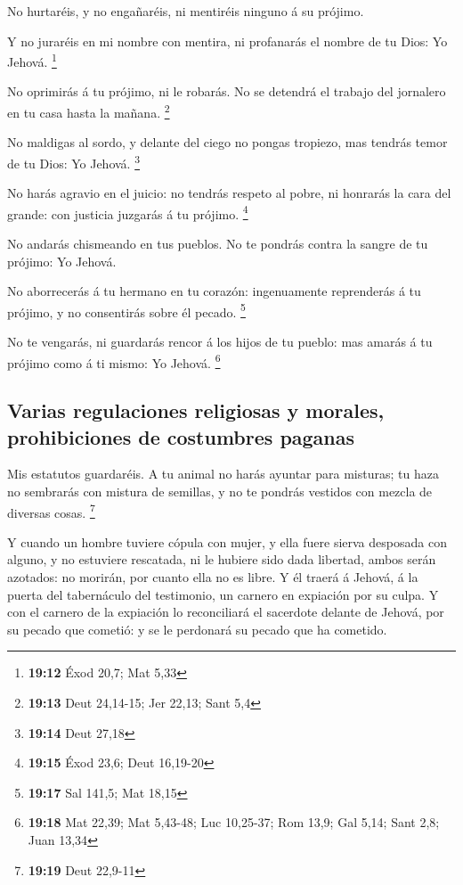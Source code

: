  No hurtaréis, y no engañaréis, ni mentiréis ninguno á su
prójimo.

 Y no juraréis en mi nombre con mentira, ni profanarás el
nombre de tu Dios: Yo Jehová. \footnote{\textbf{19:12} Éxod 20,7; Mat
  5,33}

 No oprimirás á tu prójimo, ni le robarás. No se detendrá
el trabajo del jornalero en tu casa hasta la mañana. \footnote{\textbf{19:13}
  Deut 24,14-15; Jer 22,13; Sant 5,4}

 No maldigas al sordo, y delante del ciego no pongas
tropiezo, mas tendrás temor de tu Dios: Yo Jehová. \footnote{\textbf{19:14}
  Deut 27,18}

 No harás agravio en el juicio: no tendrás respeto al
pobre, ni honrarás la cara del grande: con justicia juzgarás á tu
prójimo. \footnote{\textbf{19:15} Éxod 23,6; Deut 16,19-20}

 No andarás chismeando en tus pueblos. No te pondrás contra
la sangre de tu prójimo: Yo Jehová.

 No aborrecerás á tu hermano en tu corazón: ingenuamente
reprenderás á tu prójimo, y no consentirás sobre él pecado. \footnote{\textbf{19:17}
  Sal 141,5; Mat 18,15}

 No te vengarás, ni guardarás rencor á los hijos de tu
pueblo: mas amarás á tu prójimo como á ti mismo: Yo Jehová. \footnote{\textbf{19:18}
  Mat 22,39; Mat 5,43-48; Luc 10,25-37; Rom 13,9; Gal 5,14; Sant 2,8;
  Juan 13,34}

\hypertarget{varias-regulaciones-religiosas-y-morales-prohibiciones-de-costumbres-paganas}{%
\subsection{Varias regulaciones religiosas y morales, prohibiciones de
costumbres
paganas}\label{varias-regulaciones-religiosas-y-morales-prohibiciones-de-costumbres-paganas}}

 Mis estatutos guardaréis. A tu animal no harás ayuntar
para misturas; tu haza no sembrarás con mistura de semillas, y no te
pondrás vestidos con mezcla de diversas cosas. \footnote{\textbf{19:19}
  Deut 22,9-11}

 Y cuando un hombre tuviere cópula con mujer, y ella fuere
sierva desposada con alguno, y no estuviere rescatada, ni le hubiere
sido dada libertad, ambos serán azotados: no morirán, por cuanto ella no
es libre.  Y él traerá á Jehová, á la puerta del
tabernáculo del testimonio, un carnero en expiación por su culpa.
 Y con el carnero de la expiación lo reconciliará el
sacerdote delante de Jehová, por su pecado que cometió: y se le
perdonará su pecado que ha cometido.

